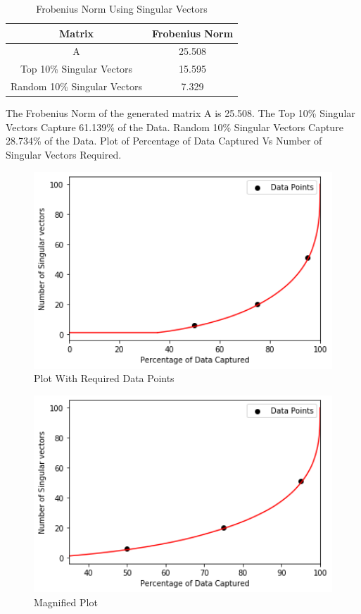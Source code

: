 \documentclass[a4 paper]{article}
\begin{document}
\begin{table}[h!]
\centering
 \begin{tabular}{|c|c|} 
 \hline
 Matrix  & Frobenius Norm \\ [0.5ex] 
\hline
A                             &  25.508\\
Top 10\% Singular Vectors     &  15.595\\
Random 10\% Singular Vectors  &  7.329\\
\hline
\end{tabular}
\caption{Frobenius Norm Using Singular Vectors}
\end{table}
 The Frobenius Norm of the generated matrix A is 25.508.
 The Top 10\% Singular Vectors Capture  61.139\% of the Data.
 Random 10\% Singular Vectors Capture 28.734\% of the Data.
 Plot of Percentage of Data Captured Vs Number of Singular Vectors Required.\\
\begin{figure}[!htb]
    \centering
    \begin{minipage}{0.49\textwidth}
        \centering
        \includegraphics[width=1\textwidth]{SIndependent1.png} \\
         Plot With Required Data Points
    \end{minipage}\hfill
    \begin{minipage}{0.49\textwidth}
        \centering
        \includegraphics[width=1\textwidth]{SIndependent2.png}\\
          Magnified Plot
    \end{minipage}
    \label{fig:l}
\end{figure}
\end{document}
